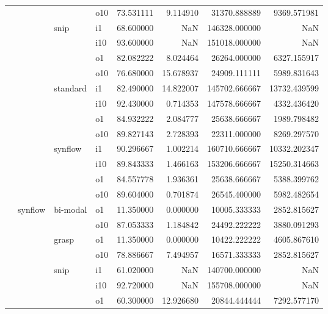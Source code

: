 \begin{longtable}{llllrrrr}
      &     &         & o10 &  73.531111 &   9.114910 &     31370.888889 &   9369.571981 \\
      &     & snip & i1 &  68.600000 &        NaN &    146328.000000 &           NaN \\
      &     &         & i10 &  93.600000 &        NaN &    151018.000000 &           NaN \\
      &     &         & o1 &  82.082222 &   8.024464 &     26264.000000 &   6327.155917 \\
      &     &         & o10 &  76.680000 &  15.678937 &     24909.111111 &   5989.831643 \\
      &     & standard & i1 &  82.490000 &  14.822007 &    145702.666667 &  13732.439599 \\
      &     &         & i10 &  92.430000 &   0.714353 &    147578.666667 &   4332.436420 \\
      &     &         & o1 &  84.932222 &   2.084777 &     25638.666667 &   1989.798482 \\
      &     &         & o10 &  89.827143 &   2.728393 &     22311.000000 &   8269.297570 \\
      &     & synflow & i1 &  90.296667 &   1.002214 &    160710.666667 &  10332.202347 \\
      &     &         & i10 &  89.843333 &   1.466163 &    153206.666667 &  15250.314663 \\
      &     &         & o1 &  84.557778 &   1.936361 &     25638.666667 &   5388.399762 \\
      &     &         & o10 &  89.604000 &   0.701874 &     26545.400000 &   5982.482654 \\
      & synflow & bi-modal & o1 &  11.350000 &   0.000000 &     10005.333333 &   2852.815627 \\
      &     &         & o10 &  87.053333 &   1.184842 &     24492.222222 &   3880.091293 \\
      &     & grasp & o1 &  11.350000 &   0.000000 &     10422.222222 &   4605.867610 \\
      &     &         & o10 &  78.886667 &   7.494957 &     16571.333333 &   2852.815627 \\
      &     & snip & i1 &  61.020000 &        NaN &    140700.000000 &           NaN \\
      &     &         & i10 &  92.720000 &        NaN &    155708.000000 &           NaN \\
      &     &         & o1 &  60.300000 &  12.926680 &     20844.444444 &   7292.577170 \\

\end{longtable}
